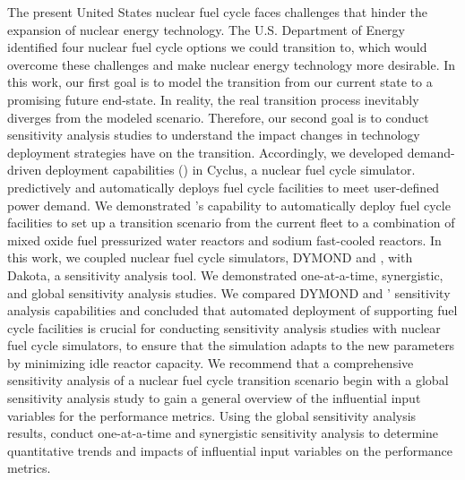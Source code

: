 \vspace{-1.5cm}
The present United States nuclear fuel cycle faces challenges that hinder 
the expansion of nuclear energy technology. 
The U.S. Department of Energy identified four nuclear fuel cycle 
options we could transition to, which would overcome these challenges 
and make nuclear energy technology more desirable. 
In this work, our first goal is to model the transition from our current
state to a promising future end-state.
In reality, the real transition process inevitably diverges from the 
modeled scenario. 
Therefore, our second goal is to conduct sensitivity analysis 
studies to understand the impact changes in technology deployment 
strategies have on the transition. 
Accordingly, we developed demand-driven deployment capabilities 
(\deploy) in Cyclus, a nuclear fuel cycle simulator. 
\deploy predictively and automatically deploys fuel cycle facilities 
to meet user-defined power demand.
We demonstrated \deploy's capability to automatically deploy fuel 
cycle facilities to set up a transition scenario from the current 
fleet to a combination of mixed oxide fuel pressurized water reactors 
and sodium fast-cooled reactors. 
In this work, we coupled nuclear fuel cycle simulators, DYMOND 
and \Cyclus, with Dakota, a sensitivity analysis tool. 
We demonstrated 
one-at-a-time, synergistic, and global sensitivity analysis studies.
We compared DYMOND and \Cyclus' sensitivity analysis capabilities 
and concluded that automated deployment of supporting fuel cycle 
facilities is crucial for conducting sensitivity analysis studies 
with nuclear fuel cycle simulators, to ensure that the simulation 
adapts to the new parameters by minimizing idle reactor capacity. 
We recommend that a comprehensive sensitivity analysis of a 
nuclear fuel cycle transition scenario begin with a global 
sensitivity analysis study to gain a general overview of the 
influential input variables for the performance metrics. 
Using the global sensitivity analysis results, 
conduct one-at-a-time and synergistic sensitivity 
analysis to determine quantitative trends and impacts of influential 
input variables on the performance metrics.
